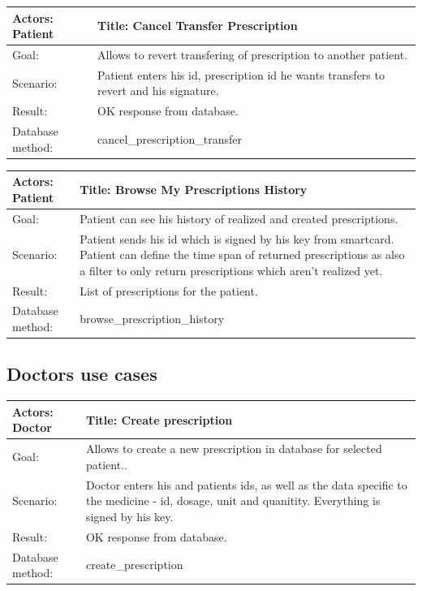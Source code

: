     \begin{longtable}{| p{6cm} | p{7.75cm} |}
    \hline
    Actors: Patient &Title: Cancel Transfer Prescription \\ \hline
    Goal: & Allows to revert transfering of prescription to another patient. \\ \hline
    Scenario: & Patient enters his id, prescription id he wants transfers to revert and his signature. \\ \hline
    Result: & OK response from database. \\ \hline
    Database  method: & cancel\_prescription\_transfer \\ \hline
\end{longtable}

    \begin{longtable}{| p{6cm} | p{7.75cm} |}
    \hline
    Actors: Patient &Title: Browse My Prescriptions History \\ \hline
    Goal: & Patient can see his history of realized and created prescriptions.\\ \hline
    Scenario: & Patient sends his id which is signed by his key from smartcard. Patient can define the time span of returned prescriptions as also a filter to only return prescriptions which aren't realized yet. \\ \hline
    Result: & List of prescriptions for the patient. \\ \hline
    Database  method: & browse\_prescription\_history \\ \hline

\end{longtable}

\subsection{Doctors use cases}


    \begin{longtable}{| p{6cm} | p{7.75cm} |}
    \hline
   Actors:  Doctor &Title: Create prescription \\ \hline
    Goal: & Allows to create a new prescription in database for selected patient..\\ \hline
    Scenario: & Doctor enters his and patients ids, as well as the data specific to the medicine - id, dosage, unit and quanitity. Everything is signed by his key. \\ \hline
    Result: & OK response from database. \\ \hline
    Database  method: & create\_prescription \\ \hline
    \end{longtable}



